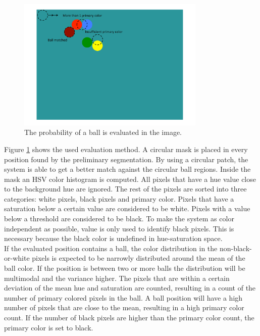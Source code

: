 \begin{figure}[H]
\begin{center}
\includegraphics[width=0.8\textwidth]{images/ballfind.pdf}
\caption{The probability of a ball is evaluated in the image.}
\label{fig:ballfind}
\end{center}
\end{figure}
Figure \ref{fig:ballfind} shows the used evaluation method. A circular mask is placed in every position found by the preliminary segmentation. By using a circular patch, the system is able to get a better match against the circular ball regions. Inside the mask an HSV color histogram is computed. All pixels that have a hue value close to the background hue are ignored. The rest of the pixels are sorted into three categories: white pixels, black pixels and primary color. Pixels that have a saturation below a certain value are considered to be white. Pixels with a value below a threshold are considered to be black. To make the system as color independent as possible, value is only used to identify black pixels. This is necessary because the black color is undefined in hue-saturation space.\\

If the evaluated position contains a ball, the color distribution in the non-black-or-white pixels is expected to be narrowly distributed around the mean of the ball color. If the position is between two or more balls the distribution will be multimodal and the variance higher. The pixels that are within a certain deviation of the mean hue and saturation are counted, resulting in a count of the number of primary colored pixels in the ball. A ball position will have a high number of pixels that are close to the mean, resulting in a high primary color count. If the number of black pixels are higher than the primary color count, the primary color is set to black.\\


